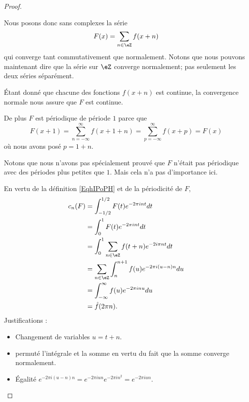 \begin{proof}
\begin{subproof}

		Nous posons donc sans complexes la série
		\begin{equation}
			F(x)=\sum_{n\in \eZ}f(x+n)
		\end{equation}
		qui converge tant commutativement que normalement. Notons que nous pouvons maintenant dire que la série sur \( \eZ\) converge normalement; pas seulement les deux séries séparément.

		Étant donné que chacune des fonctions \( f(x+n)\) est continue, la convergence normale nous assure que \( F\) est continue.

		De plus \( F\) est périodique de période \( 1\) parce que
		\begin{equation}
			F(x+1)=\sum_{n=-\infty}^{\infty}f(x+1+n)=\sum_{p=-\infty}^{\infty}f(x+p)=F(x)
		\end{equation}
		où nous avons posé \( p=1+n\).

		Notons que nous n'avons pas spécialement prouvé que \( F\) n'était pas périodique avec des périodes plus petites que \( 1\). Mais cela n'a pas d'importance ici.


		En vertu de la définition \eqref{EqhIPoPH} et de la périodicité de \( F\),
		\begin{subequations}
			\begin{align}
				c_n(F) & =\int_{-1/2}^{1/2}F(t) e^{-2\pi int}dt                \\
				       & =\int_0^1F(t) e^{-2\pi int}dt                         \\
				       & =\int_0^1\sum_{n\in \eZ}f(t+n) e^{-2 i\pi nt}dt       \\
				       & =\sum_{n\in \eZ}\int_n^{n+1}f(u) e^{-2\pi i (u-n)n}du \\
				       & =\int_{-\infty}^{\infty}f(u) e^{-2\pi inu}du          \\
				       & =\hat f(2\pi n).
			\end{align}
		\end{subequations}
		Justifications :
		\begin{itemize}
			\item
			      Changement de variables \( u=t+n\).
			\item
			      permuté l'intégrale et la somme en vertu du fait que la somme converge normalement.
			\item
			      Égalité \( e^{-2\pi i(u-n)n}=e^{-2\pi iun}e^{-2\pi in^2}=e^{-2\pi iun}\).
		\end{itemize}


\end{subproof}
\end{proof}
